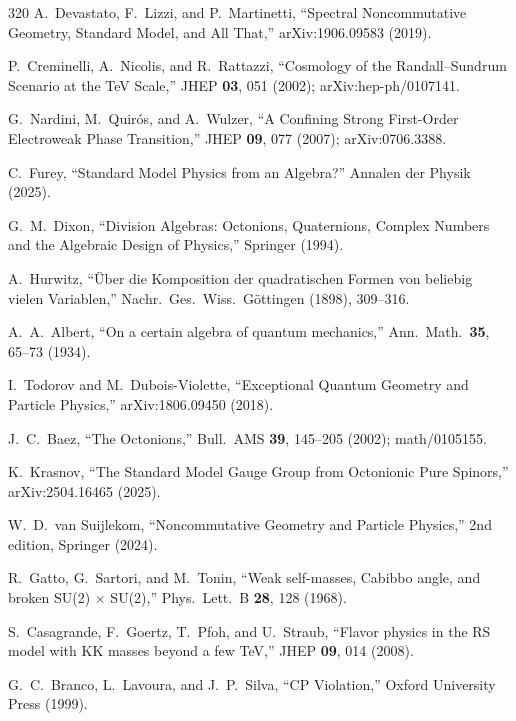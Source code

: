 \begin{thebibliography}{320}
A.~Devastato, F.~Lizzi, and P.~Martinetti,
``Spectral Noncommutative Geometry, Standard Model, and All That,''
arXiv:1906.09583 (2019).

P.~Creminelli, A.~Nicolis, and R.~Rattazzi,
``Cosmology of the Randall--Sundrum Scenario at the TeV Scale,''
JHEP \textbf{03}, 051 (2002);
arXiv:hep-ph/0107141.

G.~Nardini, M.~Quir\'{o}s, and A.~Wulzer,
``A Confining Strong First-Order Electroweak Phase Transition,''
JHEP \textbf{09}, 077 (2007);
arXiv:0706.3388.

C.~Furey,
``Standard Model Physics from an Algebra?''
Annalen der Physik (2025).

G.~M.~Dixon,
``Division Algebras: Octonions, Quaternions, Complex Numbers and the Algebraic Design of Physics,''
Springer (1994).

A.~Hurwitz,
``\"Uber die Komposition der quadratischen Formen von beliebig vielen Variablen,''
Nachr.\ Ges.\ Wiss.\ G\"ottingen (1898), 309--316.

A.~A.~Albert,
``On a certain algebra of quantum mechanics,''
Ann.\ Math.\ \textbf{35}, 65--73 (1934).

I.~Todorov and M.~Dubois-Violette,
``Exceptional Quantum Geometry and Particle Physics,''
arXiv:1806.09450 (2018).

J.~C.~Baez,
``The Octonions,''
Bull.\ AMS \textbf{39}, 145--205 (2002);
math/0105155.

K.~Krasnov,
``The Standard Model Gauge Group from Octonionic Pure Spinors,''
arXiv:2504.16465 (2025).

W.~D.~van Suijlekom,
``Noncommutative Geometry and Particle Physics,''
2nd edition, Springer (2024).

R.~Gatto, G.~Sartori, and M.~Tonin,
``Weak self-masses, Cabibbo angle, and broken SU(2) $\times$ SU(2),''
Phys.\ Lett.\ B \textbf{28}, 128 (1968).

S.~Casagrande, F.~Goertz, T.~Pfoh, and U.~Straub,
``Flavor physics in the RS model with KK masses beyond a few TeV,''
JHEP \textbf{09}, 014 (2008).

G.~C.~Branco, L.~Lavoura, and J.~P.~Silva,
``CP Violation,''
Oxford University Press (1999).


\end{thebibliography}
